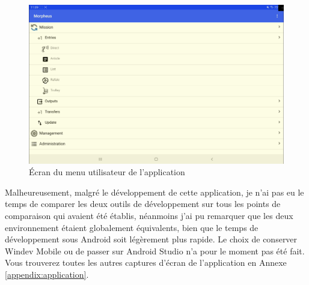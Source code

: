 \documentclass[a4paper, 12pt, french]{article}
\newcommand{\bdot}{\item[\color{ssiYellow}\ding{108}]}
\begin{document}
			\begin{figure}[h!]
				\begin{center}
					\includegraphics[width=0.7\linewidth]{application/user_menu_subtab.PNG}
				\end{center}
				\caption{Écran du menu utilisateur de l'application}
				\label{fig:applications:user_menu_subtab}
			\end{figure}

		Malheureusement, malgré le développement de cette application, je n'ai pas eu le temps de comparer les deux outils de développement sur tous les points de comparaison qui avaient été établis, néanmoins j'ai pu remarquer que les deux environnement étaient globalement équivalents, bien que le temps de développement sous Android soit légèrement plus rapide.	 Le choix de conserver Windev Mobile ou de passer sur Android Studio n'a pour le moment pas été fait.\\
		
		Vous trouverez toutes les autres captures d'écran de l'application en Annexe \ref{appendix:application}.
	

\end{document}
